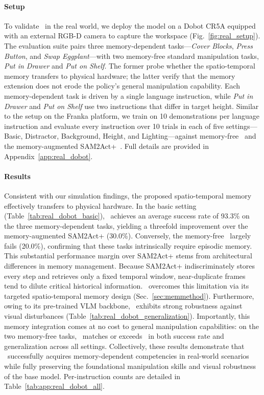 \paragraph{Setup}
To validate \memmethod\ in the real world, we deploy the model on a Dobot CR5A equipped with an external RGB-D camera to capture the workspace (Fig.~\ref{fig:real_setup}). The evaluation suite pairs three memory-dependent tasks---\emph{Cover Blocks}, \emph{Press Button}, and \emph{Swap Eggplant}---with two memory-free standard manipulation tasks, \emph{Put in Drawer} and \emph{Put on Shelf}. The former probe whether the spatio-temporal memory transfers to physical hardware; the latter verify that the memory extension does not erode the policy's general manipulation capability. Each memory-dependent task is driven by a single language instruction, while \emph{Put in Drawer} and \emph{Put on Shelf} use two instructions that differ in target height. Similar to the setup on the Franka platform, we train on 10 demonstrations per language instruction and evaluate every instruction over 10 trials in each of five settings---Basic, Distractor, Background, Height, and Lighting---against memory-free \method\ and the memory-augmented SAM2Act+~\cite{fang2025sam2act}. Full details are provided in Appendix~\ref{app:real_dobot}.

\paragraph{Results}
Consistent with our simulation findings, the proposed spatio-temporal memory effectively transfers to physical hardware. In the basic setting (Table~\ref{tab:real_dobot_basic}), \memmethod\ achieves an average success rate of 93.3\% on the three memory-dependent tasks, yielding a threefold improvement over the memory-augmented SAM2Act+ (30.0\%). Conversely, the memory-free \method\ largely fails (20.0\%), confirming that these tasks intrinsically require episodic memory. This substantial performance margin over SAM2Act+ stems from architectural differences in memory management. Because SAM2Act+ indiscriminately stores every step and retrieves only a fixed temporal window, near-duplicate frames tend to dilute critical historical information. \memmethod\ overcomes this limitation via its targeted spatio-temporal memory design (Sec.~\ref{sec:memmethod}). Furthermore, owing to its pre-trained VLM backbone, \memmethod\ exhibits strong robustness against visual disturbances (Table~\ref{tab:real_dobot_generalization}). Importantly, this memory integration comes at no cost to general manipulation capabilities: on the two memory-free tasks, \memmethod\ matches or exceeds \method\ in both success rate and generalization across all settings. Collectively, these results demonstrate that \memmethod\ successfully acquires memory-dependent competencies in real-world scenarios while fully preserving the foundational manipulation skills and visual robustness of the base model. Per-instruction counts are detailed in Table~\ref{tab:app:real_dobot_all}.




